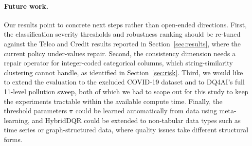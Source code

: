 \documentclass[runningheads]{llncs}
\begin{document}
\paragraph{Future work.}
Our results point to concrete next steps rather than open-ended
directions.
First, the classification severity thresholds and robustness
ranking should be re-tuned against the Telco and Credit results
reported in Section~\ref{sec:results}, where the current policy
under-values repair.
Second, the consistency dimension needs a repair operator for
integer-coded categorical columns, which string-similarity
clustering cannot handle, as identified in
Section~\ref{sec:risk}.
Third, we would like to extend the evaluation to the excluded
COVID-19 dataset and to DQ4AI's full 11-level pollution sweep,
both of which we had to scope out for this study to keep the
experiments tractable within the available compute time.
Finally, the threshold parameters $\boldsymbol{\tau}$ could be
learned automatically from data using meta-learning, and
HybridDQR could be extended to non-tabular data types such as
time series or graph-structured data, where quality issues take
different structural forms.
\end{document}

